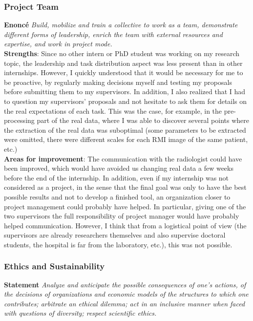\documentclass[preprint,12pt]{elsarticle}
\begin{document}
\subsubsection{Project Team}

\noindent \textbf{Enoncé} \textit{Build, mobilize and train a collective to work as a team, demonstrate different forms of leadership, enrich the team with external resources and expertise, and work in project mode.}\\[3 pt]

\noindent \textbf{Strengths}: Since no other intern or PhD student was working on my research topic, the leadership and task distribution aspect was less present than in other internships. However, I quickly understood that it would be necessary for me to be proactive, by regularly making decisions myself and testing my proposals before submitting them to my supervisors. In addition, I also realized that I had to question my supervisors' proposals and not hesitate to ask them for details on the real expectations of each task. This was the case, for example, in the pre-processing part of the real data, where I was able to discover several points where the extraction of the real data was suboptimal (some parameters to be extracted were omitted, there were different scales for each RMI image of the same patient, etc.)\\[3 pt]

\noindent \textbf{Areas for improvement}: The communication with the radiologist could have been improved, which would have avoided us changing real data a few weeks before the end of the internship. In addition, even if my internship was not considered as a project, in the sense that the final goal was only to have the best possible results and not to develop a finished tool, an organization closer to project management could probably have helped. In particular, giving one of the two supervisors the full responsibility of project manager would have probably helped communication. However, I think that from a logistical point of view (the supervisors are already researchers themselves and also supervise doctoral students, the hospital is far from the laboratory, etc.), this was not possible.

\subsubsection{Ethics and Sustainability}

\noindent \textbf{Statement} \textit{Analyze and anticipate the possible consequences of one's actions, of the decisions of organizations and economic models of the structures to which one contributes; arbitrate an ethical dilemma; act in an inclusive manner when faced with questions of diversity; respect scientific ethics.}\\[3 pt]
\end{document}

